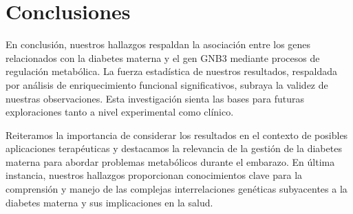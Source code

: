 \section{Conclusiones}

En conclusión, nuestros hallazgos respaldan la asociación entre los genes relacionados con la diabetes materna y el gen GNB3 mediante procesos de regulación metabólica. La fuerza estadística de nuestros resultados, respaldada por análisis de enriquecimiento funcional significativos, subraya la validez de nuestras observaciones. Esta investigación sienta las bases para futuras exploraciones tanto a nivel experimental como clínico.

Reiteramos la importancia de considerar los resultados en el contexto de posibles aplicaciones terapéuticas y destacamos la relevancia de la gestión de la diabetes materna para abordar problemas metabólicos durante el embarazo. En última instancia, nuestros hallazgos proporcionan conocimientos clave para la comprensión y manejo de las complejas interrelaciones genéticas subyacentes a la diabetes materna y sus implicaciones en la salud.


